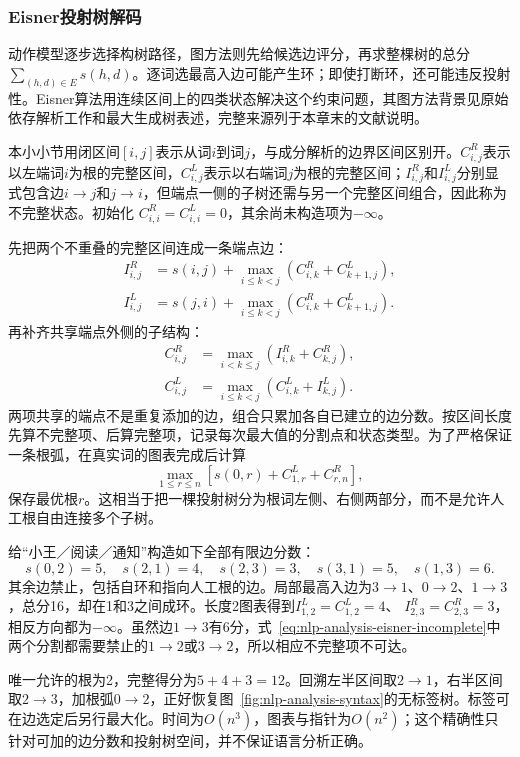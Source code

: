 \subsubsection{Eisner投射树解码}
\label{sec:nlp-analysis-eisner}

动作模型逐步选择构树路径，图方法则先给候选边评分，再求整棵树的总分$\sum_{(h,d)\in E}s(h,d)$。逐词选最高入边可能产生环；即使打断环，还可能违反投射性。Eisner算法用连续区间上的四类状态解决这个约束问题，其图方法背景见原始依存解析工作和最大生成树表述，完整来源列于本章末的文献说明。

本小小节用闭区间$[i,j]$表示从词$i$到词$j$，与成分解析的边界区间区别开。$C^R_{i,j}$表示以左端词$i$为根的完整区间，$C^L_{i,j}$表示以右端词$j$为根的完整区间；$I^R_{i,j}$和$I^L_{i,j}$分别显式包含边$i\to j$和$j\to i$，但端点一侧的子树还需与另一个完整区间组合，因此称为不完整状态。初始化
$C^R_{i,i}=C^L_{i,i}=0$，其余尚未构造项为$-\infty$。

先把两个不重叠的完整区间连成一条端点边：
\begin{align}
 I^R_{i,j}&=s(i,j)+
  \max_{i\leq k<j}(C^R_{i,k}+C^L_{k+1,j}),\nonumber\\
 I^L_{i,j}&=s(j,i)+
  \max_{i\leq k<j}(C^R_{i,k}+C^L_{k+1,j}).
 \label{eq:nlp-analysis-eisner-incomplete}
\end{align}
再补齐共享端点外侧的子结构：
\begin{align}
 C^R_{i,j}&=\max_{i<k\leq j}
            (I^R_{i,k}+C^R_{k,j}),\nonumber\\
 C^L_{i,j}&=\max_{i\leq k<j}
            (C^L_{i,k}+I^L_{k,j}).
 \label{eq:nlp-analysis-eisner-complete}
\end{align}
两项共享的端点不是重复添加的边，组合只累加各自已建立的边分数。按区间长度先算不完整项、后算完整项，记录每次最大值的分割点和状态类型。为了严格保证一条根弧，在真实词的图表完成后计算
\[
 \max_{1\leq r\leq n}
 [s(0,r)+C^L_{1,r}+C^R_{r,n}],
\]
保存最优根$r$。这相当于把一棵投射树分为根词左侧、右侧两部分，而不是允许人工根自由连接多个子树。

给“小王／阅读／通知”构造如下全部有限边分数：
\[
 s(0,2)=5,\quad s(2,1)=4,\quad s(2,3)=3,\quad
 s(3,1)=5,\quad s(1,3)=6.
\]
其余边禁止，包括自环和指向人工根的边。局部最高入边为$3\to1$、$0\to2$、$1\to3$，总分16，却在1和3之间成环。长度2图表得到$I^L_{1,2}=C^L_{1,2}=4$、
$I^R_{2,3}=C^R_{2,3}=3$，相反方向都为$-\infty$。虽然边$1\to3$有6分，式~\eqref{eq:nlp-analysis-eisner-incomplete}中两个分割都需要禁止的$1\to2$或$3\to2$，所以相应不完整项不可达。

唯一允许的根为2，完整得分为$5+4+3=12$。回溯左半区间取$2\to1$，右半区间取$2\to3$，加根弧$0\to2$，正好恢复图~\ref{fig:nlp-analysis-syntax}的无标签树。标签可在边选定后另行最大化。时间为$O(n^3)$，图表与指针为$O(n^2)$；这个精确性只针对可加的边分数和投射树空间，并不保证语言分析正确。

